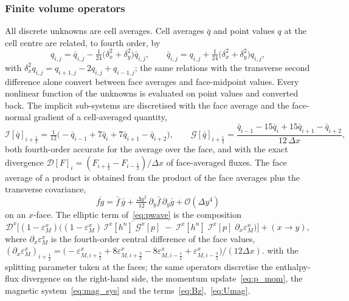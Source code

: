 \documentclass[a4paper,fleqn]{cas-sc}
\theoremstyle{remark}
\newcommand{\eps}{\varepsilon}
\begin{document}
\subsubsection{Finite volume operators}
\label{sec:fv_ops}
All discrete unknowns are cell averages. Cell averages $\bar q$ and point values
$q$ at the cell centre are related, to fourth order, by
\begin{equation}
\label{eq:convdeconv}
q_{i,j}=\bar q_{i,j}-\tfrac1{24}\big(\delta_x^{2}+\delta_y^{2}\big)\bar q_{i,j},
\qquad
\bar q_{i,j}=q_{i,j}+\tfrac1{24}\big(\delta_x^{2}+\delta_y^{2}\big)q_{i,j},
\end{equation}
with $\delta_x^{2}q_{i,j}=q_{i+1,j}-2q_{i,j}+q_{i-1,j}$; the same relations with
the transverse second difference alone convert between face averages and
face-midpoint values. Every nonlinear function of the unknowns is evaluated on
point values and converted back. The implicit sub-systems are discretised with
the face average and the face-normal gradient of a cell-averaged quantity,
\begin{equation}
\label{eq:family4}
\mathcal I[\bar q]_{i+\frac12}=\tfrac{1}{12}\big(-\bar q_{i-1}+7\bar q_i+7\bar q_{i+1}-\bar q_{i+2}\big),
\qquad
\mathcal G[\bar q]_{i+\frac12}=\frac{\bar q_{i-1}-15\bar q_i+15\bar q_{i+1}-\bar q_{i+2}}{12\,\Delta x},
\end{equation}
both fourth-order accurate for the average over the face, and with the exact
divergence $\mathcal D[F]_i=(F_{i+\frac12}-F_{i-\frac12})/\Delta x$ of face-averaged
fluxes. The face average of a product is obtained from the product of the face
averages plus the transverse covariance,
\begin{equation}
\label{eq:covariance}
\overline{fg}=\bar f\,\bar g+\tfrac{\Delta y^{2}}{12}\,\partial_y\bar f\,\partial_y\bar g
+\mathcal O(\Delta y^{4})
\end{equation}
on an $x$-face. The elliptic term of~\eqref{eq:pwave} is the composition
\begin{equation}
\label{eq:composed4}
\mathcal D^{x}\Big[(1-\eps^{x}_{M})\Big((1-\eps^{x}_{M})\,
\overline{\mathcal I^{x}[h^{n}]\;\mathcal G^{x}[p]}
\;-\;\mathcal I^{x}[h^{n}]\;\mathcal I^{x}[p]\;\partial_x\eps^{x}_{M}\Big)\Big]+(x\to y),
\end{equation}
where $\partial_x\eps^{x}_{M}$ is the fourth-order central difference of the face values,
$(\partial_x\eps^{x}_{M})_{i+\frac12}=\big(-\eps^{x}_{M,i+\frac52}+8\eps^{x}_{M,i+\frac32}
-8\eps^{x}_{M,i-\frac12}+\eps^{x}_{M,i-\frac32}\big)/(12\Delta x)$.
with the splitting parameter taken at the faces; the same operators discretise
the enthalpy-flux divergence on the right-hand side, the momentum
update~\eqref{eq:p_mom}, the magnetic system~\eqref{eq:mag_sys} and the
terms~\eqref{eq:Bz},~\eqref{eq:Umag}.
\end{document}
